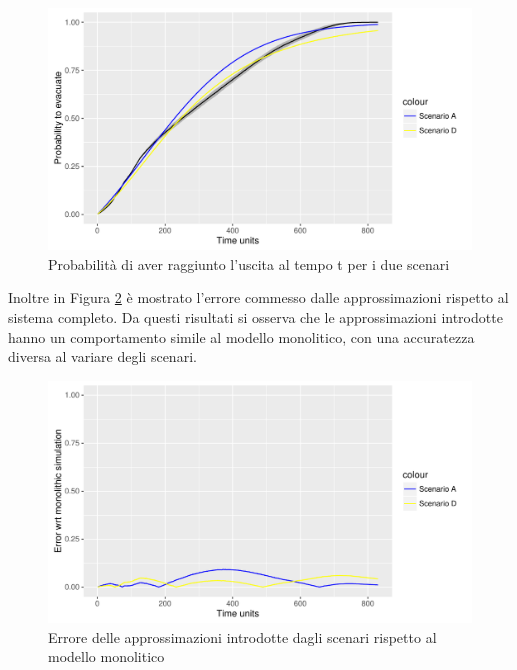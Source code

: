 \begin{figure}[htbp]
\centering
\includegraphics[width=.8\textwidth,height=\textheight,keepaspectratio]{images/scenariosAD.pdf}
\caption{Probabilità di aver raggiunto l'uscita al tempo t per i due scenari}
\label{fig:scenariosAD}
\end{figure}

Inoltre in Figura \ref{fig:errorsplotAD} è mostrato l'errore commesso dalle approssimazioni rispetto al sistema completo. Da questi risultati si osserva che le approssimazioni introdotte hanno un comportamento simile al modello monolitico, con una accuratezza diversa al variare degli scenari.

\begin{figure}[htbp]
\centering
\includegraphics[width=.8\textwidth,height=\textheight,keepaspectratio]{images/errorplotAD.pdf}
\caption{Errore delle approssimazioni introdotte dagli scenari rispetto al modello monolitico}
\label{fig:errorsplotAD}
\end{figure}



 